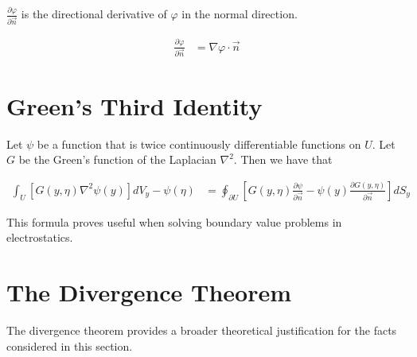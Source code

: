 \documentclass[book.tex]{subfiles}
\begin{document}
$\frac{\partial \varphi}{\partial \vec{n}}$ is the directional derivative of $\varphi$ in the normal direction.

\begin{align}
\frac{\partial \varphi}{\partial \vec{n}} &= \nabla \varphi \cdot \vec{n}
\end{align}


\section{Green's Third Identity}

Let $\psi$ be a function that is twice continuously differentiable functions on $U$. Let $G$ be the Green's function of the Laplacian $\nabla^2$. Then we have that

\begin{align}
\int_U [G(y, \eta) \nabla^2 \psi(y)] dV_y - \psi(\eta) &= \oint_{\partial U} \left [ G(y, \eta)\frac{\partial \psi}{\partial \vec{n}} - \psi(y) \frac{\partial G(y, \eta)}{\partial \vec{n}} \right ] dS_y
\end{align}

This formula proves useful when solving boundary value problems in electrostatics.

\section{The Divergence Theorem}

The divergence theorem provides a broader theoretical justification for the facts considered in this section.
\end{document}
